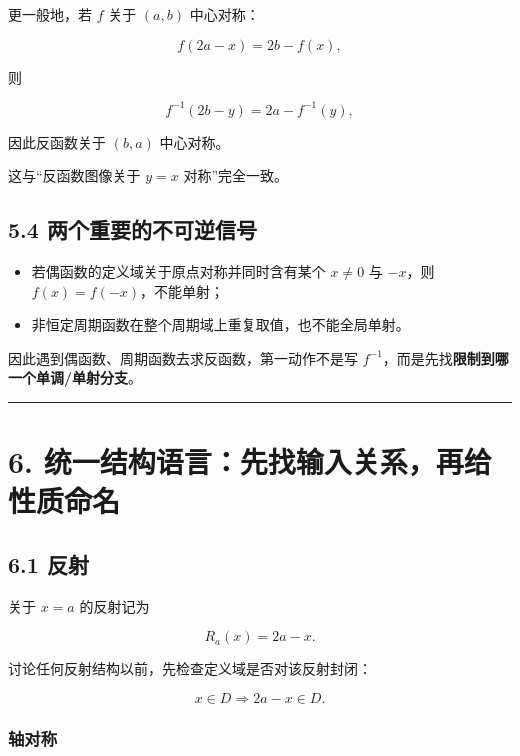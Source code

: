 \documentclass[11pt,a4paper]{ctexart}
\providecommand{\tightlist}{}
\begin{document}
更一般地，若 \(f\) 关于 \((a,b)\) 中心对称：

\[
f(2a-x)=2b-f(x),
\]

则

\[
f^{-1}(2b-y)=2a-f^{-1}(y),
\]

因此反函数关于 \((b,a)\) 中心对称。

这与``反函数图像关于 \(y=x\) 对称''完全一致。

\subsection{5.4
两个重要的不可逆信号}\label{ux4e24ux4e2aux91cdux8981ux7684ux4e0dux53efux9006ux4fe1ux53f7}

\begin{itemize}
\tightlist
\item
  若偶函数的定义域关于原点对称并同时含有某个 \(x\ne0\) 与 \(-x\)，则
  \(f(x)=f(-x)\)，不能单射；
\item
  非恒定周期函数在整个周期域上重复取值，也不能全局单射。
\end{itemize}

因此遇到偶函数、周期函数去求反函数，第一动作不是写
\(f^{-1}\)，而是先找\textbf{限制到哪一个单调/单射分支}。

\begin{center}\rule{0.5\linewidth}{0.5pt}\end{center}

\section{6.
统一结构语言：先找输入关系，再给性质命名}\label{ux7edfux4e00ux7ed3ux6784ux8bedux8a00ux5148ux627eux8f93ux5165ux5173ux7cfbux518dux7ed9ux6027ux8d28ux547dux540d}

\subsection{6.1 反射}\label{ux53cdux5c04}

关于 \(x=a\) 的反射记为

\[
R_a(x)=2a-x.
\]

讨论任何反射结构以前，先检查定义域是否对该反射封闭：

\[
x\in D\Longrightarrow 2a-x\in D.
\]

\subsubsection{轴对称}\label{ux8f74ux5bf9ux79f0}
\end{document}
